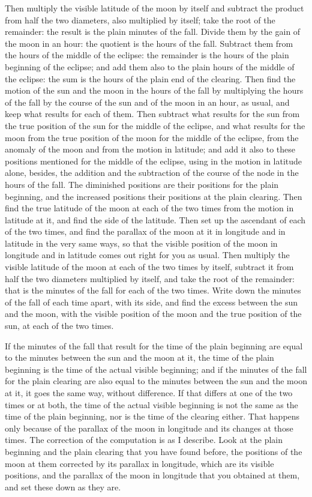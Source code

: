 \documentclass[11pt]{article}
\newcommand{\ArPage}[1]{\marginpar{\footnotesize\color{gray}Ar.\,p.\,#1}}
\begin{document}
\par \ArPage{162}Then multiply the visible latitude of the moon by itself and subtract the product from half the two diameters, also multiplied by itself; take the root of the remainder: the result is the plain minutes of the fall. Divide them by the gain of the moon in an hour: the quotient is the hours of the fall. Subtract them from the hours of the middle of the eclipse: the remainder is the hours of the plain beginning of the eclipse; and add them also to the plain hours of the middle of the eclipse: the sum is the hours of the plain end of the clearing. Then find the motion of the sun and the moon in the hours of the fall by multiplying the hours of the fall by the course of the sun and of the moon in an hour, as usual, and keep what results for each of them. Then subtract what results for the sun from the true position of the sun for the middle of the eclipse, and what results for the moon from the true position of the moon for the middle of the eclipse, from the anomaly of the moon and from the motion in latitude; and add it also to these positions mentioned for the middle of the eclipse, using in the motion in latitude alone, besides, the addition and the subtraction of the course of the node in the hours of the fall. The diminished positions are their positions for the plain beginning, and the increased positions their positions at the plain clearing. Then find the true latitude of the moon at each of the two times from the motion in latitude at it, and find the side of the latitude. Then set up the ascendant of each of the two times, and find the parallax of the moon at it in longitude and in latitude in the very same ways, so that the visible position of the moon in longitude and in latitude comes out right for you as usual. Then multiply the visible latitude of the moon at each of the two times by itself, subtract it from half the two diameters multiplied by itself, and take the root of the remainder: that is the minutes of the fall for each of the two times. Write down the minutes of the fall of each time apart, with its side, and find the excess between the sun and the moon, with the visible position of the moon and the true position of the sun, at each of the two times.\par
\par If the minutes of the fall that result for the time of the plain beginning are equal to the minutes between the sun and the moon at it, the time of the plain beginning is the time of the actual visible beginning; and if the minutes of the fall for the plain clearing are also equal to the minutes between the sun and the moon at it, it goes the same way, without difference. If that differs at one of the two times or at both, the time of the actual visible beginning is not the same as the time of the plain beginning, nor is the time of the clearing either. That happens only because of the parallax of the moon in longitude and its changes at those times. The correction of the computation is as I describe. Look at the plain beginning and the plain clearing that you have found before, the positions of the moon at them corrected by its parallax in longitude, which are its visible positions, and the parallax of the moon in longitude that you obtained at them, and set these down as they are.\par
\end{document}
